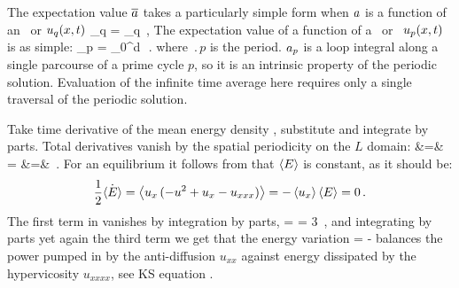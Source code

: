 The expectation value
$\overline{a}$ takes a particularly simple form when
$a$ is a function of an
\eqv\ or {\reqv} $u_q(x,t)$
\beq
         \obser_q = \expct{\obser}_q
\,,
\label{rpo:u-eqv}
\eeq
The expectation value of a function of a
\po\ or \rpo\ $u_p(x,t)$ is as simple:
\beq
         \obser_p =  \int_0^{}d\tau \,
	\expct{\obser}
\,.
\label{rpo:u-cyc}
\eeq
where $\period{p}$ is the period.
$a_p$ is a loop integral 
along a single parcourse of a prime cycle $p$, so it is an intrinsic
property of the periodic solution.
Evaluation of the infinite time average 
here requires only a single traversal of the periodic solution.

Take time derivative of the mean energy density ,
substitute  and integrate by parts. Total derivatives vanish
by the spatial periodicity on the $L$ domain:
\bea
    &=&
	 = 
	\continue
	&=&
    \,.
\label{rpo:ksErate}
\eea
For an equilibrium it follows from 
that $\left\langle {E} \right\rangle$ is constant, as it should be:
\[
   \frac{1}{2}\dot{\left\langle {E} \right\rangle} = 
\left\langle { u_x \,(-u^2 + u_{x} - u_{xxx})} \right\rangle
	= - \left\langle { u_x } \right\rangle\left\langle {E} \right\rangle =0
    \,.
\]
The first term in  vanishes by
integration by parts,
=  = 3 
\,,
and integrating by parts yet again the third term we get
that the energy variation
\beq
    = 
	   - 
balances the power pumped in by the anti-diffusion
$u_{xx}$ 
against energy dissipated by the hypervicosity $u_{xxxx}$,
see KS equation .

